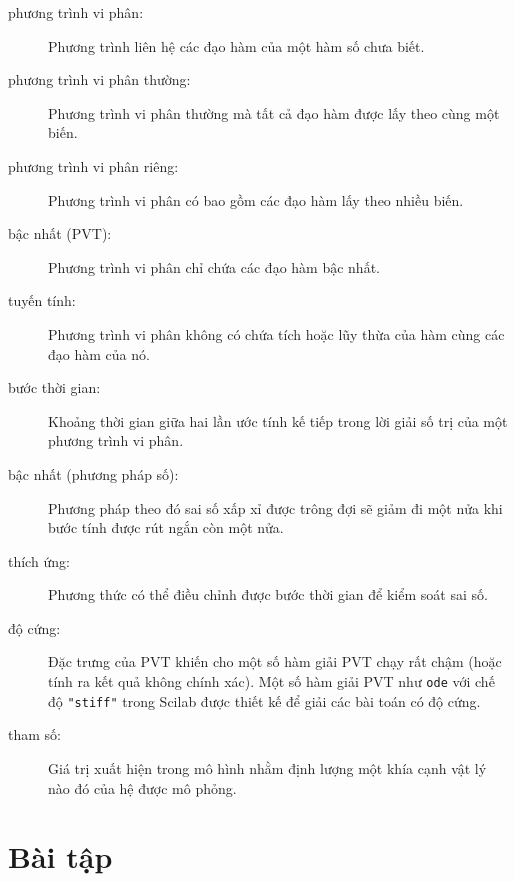 \documentclass[12pt]{book}
\begin{document}
\begin{description}

\item[phương trình vi phân:] Phương trình liên hệ các đạo hàm
của một hàm số chưa biết.

\item[phương trình vi phân thường:] Phương trình vi phân thường mà
tất cả đạo hàm được lấy theo cùng một biến.

\item[phương trình vi phân riêng:] Phương trình vi phân có bao gồm các
đạo hàm lấy theo nhiều biến.

\item[bậc nhất (PVT):] Phương trình vi phân chỉ chứa các đạo hàm bậc nhất.

\item[tuyến tính:] Phương trình vi phân không có chứa tích hoặc lũy thừa
của hàm cùng các đạo hàm của nó.

\item[bước thời gian:] Khoảng thời gian giữa hai lần ước tính kế tiếp trong
lời giải số trị của một phương trình vi phân.

\item[bậc nhất (phương pháp số):] Phương pháp theo đó sai số xấp xỉ
được trông đợi sẽ giảm đi một nửa khi bước tính được rút ngắn còn một nửa.

\item[thích ứng:] Phương thức có thể điều chỉnh được bước thời gian để
kiểm soát sai số.

\item[độ cứng:] Đặc trưng của PVT khiến cho một số hàm giải PVT chạy
rất chậm (hoặc tính ra kết quả không chính xác). Một số hàm giải PVT
như {\tt ode} với chế độ \texttt{"stiff"} trong Scilab được thiết kế để giải các bài toán có độ cứng.

\item[tham số:] Giá trị xuất hiện trong mô hình nhằm định lượng một khía
cạnh vật lý nào đó của hệ được mô phỏng.

\end{description}

\section{Bài tập}

\newcommand{\degree}{\ensuremath{^\circ}}
\end{document}
